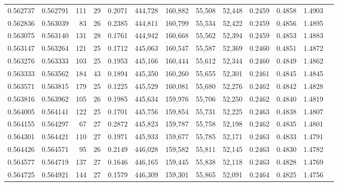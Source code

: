 \begin{tabular}{rrrrrrrrrrrrr}
0.562737 & 0.562791 &    111 &    29 &                                     0.2071 & 444,728 & 160,882 &  55,508 &  52,448 & 0.2459 & 0.4858 & 1.4903 \\
0.562836 & 0.563039 &     83 &    26 &                                     0.2385 & 444,811 & 160,799 &  55,534 &  52,422 & 0.2459 & 0.4856 & 1.4895 \\
0.563075 & 0.563140 &    131 &    28 &                                     0.1761 & 444,942 & 160,668 &  55,562 &  52,394 & 0.2459 & 0.4853 & 1.4883 \\
0.563147 & 0.563264 &    121 &    25 &                                     0.1712 & 445,063 & 160,547 &  55,587 &  52,369 & 0.2460 & 0.4851 & 1.4872 \\
0.563276 & 0.563333 &    103 &    25 &                                     0.1953 & 445,166 & 160,444 &  55,612 &  52,344 & 0.2460 & 0.4849 & 1.4862 \\
0.563333 & 0.563562 &    184 &    43 &                                     0.1894 & 445,350 & 160,260 &  55,655 &  52,301 & 0.2461 & 0.4845 & 1.4845 \\
0.563571 & 0.563815 &    179 &    25 &                                     0.1225 & 445,529 & 160,081 &  55,680 &  52,276 & 0.2462 & 0.4842 & 1.4828 \\
0.563816 & 0.563962 &    105 &    26 &                                     0.1985 & 445,634 & 159,976 &  55,706 &  52,250 & 0.2462 & 0.4840 & 1.4819 \\
0.564005 & 0.564141 &    122 &    25 &                                     0.1701 & 445,756 & 159,854 &  55,731 &  52,225 & 0.2463 & 0.4838 & 1.4807 \\
0.564155 & 0.564297 &     67 &    27 &                                     0.2872 & 445,823 & 159,787 &  55,758 &  52,198 & 0.2462 & 0.4835 & 1.4801 \\
0.564301 & 0.564421 &    110 &    27 &                                     0.1971 & 445,933 & 159,677 &  55,785 &  52,171 & 0.2463 & 0.4833 & 1.4791 \\
0.564426 & 0.564571 &     95 &    26 &                                     0.2149 & 446,028 & 159,582 &  55,811 &  52,145 & 0.2463 & 0.4830 & 1.4782 \\
0.564577 & 0.564719 &    137 &    27 &                                     0.1646 & 446,165 & 159,445 &  55,838 &  52,118 & 0.2463 & 0.4828 & 1.4769 \\
0.564725 & 0.564921 &    144 &    27 &                                     0.1579 & 446,309 & 159,301 &  55,865 &  52,091 & 0.2464 & 0.4825 & 1.4756 \\

\end{tabular}
